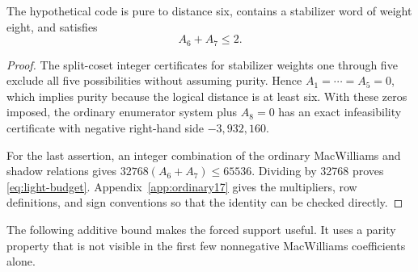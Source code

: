 \begin{proposition}\label{prop:17-enumerator}
The hypothetical code is pure to distance six, contains a stabilizer word
of weight eight, and satisfies
\begin{equation}\label{eq:light-budget}
 A_6+A_7\leq2.
\end{equation}
\end{proposition}
\begin{proof}
The split-coset integer certificates for stabilizer weights one through
five exclude all five possibilities without assuming purity. Hence
\(A_1=\cdots=A_5=0\), which implies purity because the logical distance
is at least six. With these zeros imposed, the ordinary enumerator system
plus \(A_8=0\) has an exact infeasibility certificate with negative
right-hand side \(-3,932,160\).

For the last assertion, an integer combination of the ordinary
MacWilliams and shadow relations gives
\(32768(A_6+A_7)\leq65536\). Dividing by 32768 proves
\eqref{eq:light-budget}. Appendix~\ref{app:ordinary17} gives the
multipliers, row definitions, and sign conventions so that the identity
can be checked directly.
\end{proof}

The following additive bound makes the forced support useful. It uses a
parity property that is not visible in the first few nonnegative
MacWilliams coefficients alone.

